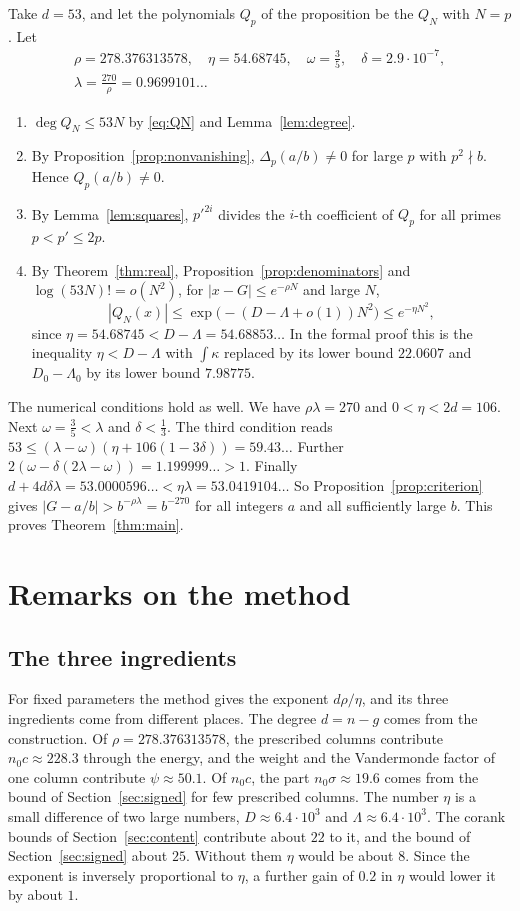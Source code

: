 \documentclass[11pt]{amsart}
\newcommand{\Rho}{278.376313578}
\newcommand{\EtaTot}{54.68745}
\newcommand{\LamCrit}{0.9699101}
\newcommand{\EtaExact}{54.68853}
\newcommand{\PayL}{53.0000596}
\newcommand{\PayR}{53.0419104}
\newcommand{\ChiLean}{22.0607}
\theoremstyle{definition}
\theoremstyle{remark}
\numberwithin{equation}{section}
\begin{document}
Take $d=53$, and let the polynomials $Q_p$ of the proposition be the $Q_N$ with $N=p$. Let
\begin{gather*}
 \rho=\Rho,\quad \eta=\EtaTot,\quad \omega=\tfrac35,\quad \delta=2.9\cdot10^{-7},\\
 \lambda=\frac{270}{\rho}=\LamCrit\ldots
\end{gather*}
\begin{enumerate}[label=(\alph*)]
\item $\deg Q_N\le53N$ by \eqref{eq:QN} and Lemma~\ref{lem:degree}.
\item By Proposition~\ref{prop:nonvanishing}, $\Delta_p(a/b)\ne0$ for large $p$ with $p^2\nmid b$. Hence
$Q_p(a/b)\ne0$.
\item By Lemma~\ref{lem:squares}, $p'^{2i}$ divides the $i$-th coefficient of $Q_p$ for all primes
$p<p'\le2p$.
\item By Theorem~\ref{thm:real}, Proposition~\ref{prop:denominators} and $\log(53N)!=o(N^2)$, for
$|x-G|\le e^{-\rho N}$ and large $N$,
\[
 |Q_N(x)|\le\exp\bigl(-(D-\Lambda+o(1))N^2\bigr)\le e^{-\eta N^2},
\]
since $\eta=\EtaTot<D-\Lambda=\EtaExact\ldots$ In the formal proof this is the inequality $\eta<D-\Lambda$ with
$\int\kappa$ replaced by its lower bound $\ChiLean$ and $D_0-\Lambda_0$ by its lower bound $7.98775$.
\end{enumerate}
The numerical conditions hold as well. We have $\rho\lambda=270$ and $0<\eta<2d=106$. Next $\omega=\frac35<\lambda$ and
$\delta<\frac13$. The third condition reads $53\le(\lambda-\omega)(\eta+106(1-3\delta))=59.43\ldots$ Further
$2(\omega-\delta(2\lambda-\omega))=1.199999\ldots>1$. Finally
$d+4d\delta\lambda=\PayL\ldots<\eta\lambda=\PayR\ldots$ So Proposition~\ref{prop:criterion} gives
$|G-a/b|>b^{-\rho\lambda}=b^{-270}$ for all integers $a$ and all sufficiently large $b$. This proves
Theorem~\ref{thm:main}.

\section{Remarks on the method}\label{sec:remarks}

\subsection{The three ingredients}
For fixed parameters the method gives the exponent $d\rho/\eta$, and its three ingredients come from
different places. The degree $d=n-g$ comes from the construction. Of $\rho=\Rho$, the prescribed columns
contribute $n_0c\approx228.3$ through the energy, and the weight and the Vandermonde factor of one column
contribute $\psi\approx50.1$. Of $n_0c$, the part $n_0\sigma\approx19.6$ comes from the bound of
Section~\ref{sec:signed} for few prescribed columns. The number $\eta$ is a small difference of two large numbers, $D\approx6.4\cdot10^3$ and
$\Lambda\approx6.4\cdot10^3$. The corank bounds of Section~\ref{sec:content} contribute about $22$ to it, and the
bound of Section~\ref{sec:signed} about $25$. Without them $\eta$ would be about $8$. Since the exponent
is inversely proportional to $\eta$, a further gain of $0.2$ in $\eta$ would lower it by about $1$.
\end{document}
